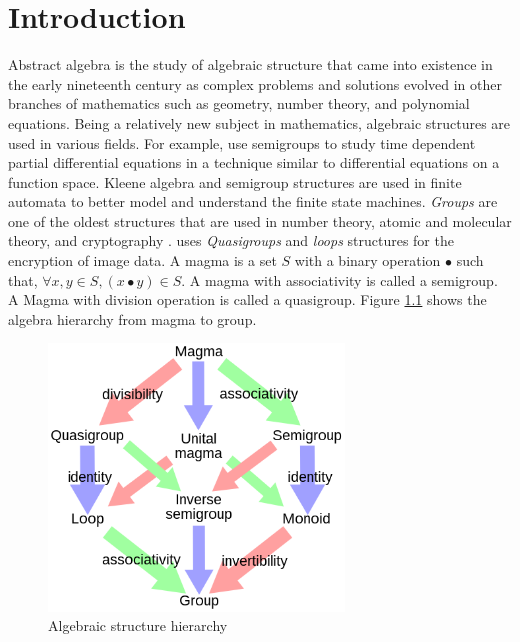 \chapter{Introduction}
Abstract algebra is the study of algebraic structure that came into existence in
the early nineteenth century as complex problems and solutions evolved in other
branches of mathematics such as geometry, number theory, and polynomial
equations. Being a relatively new subject in mathematics, algebraic structures
are used in various fields. For example, \cite{liaqat2021some} use semigroups
 to study time dependent partial
differential equations in a technique similar to differential equations on a
function space. Kleene algebra and semigroup structures are used in finite
automata to better model and understand the finite state machines.
\textit{Groups} are one of the oldest structures that are used in number theory,
atomic and molecular theory, and cryptography \cite{enwiki:1133598242}.
\cite{bruck1944some} uses \textit{Quasigroups} and \textit{loops} structures for
the encryption of image data. A magma is a set $S$ with a binary operation $∙$
such that, $\forall x,y \in S, (x ∙ y) \in S$. A magma with
associativity is called a semigroup. A Magma with division operation is called a
quasigroup. Figure \ref{fig_magma} shows the algebra hierarchy from magma to
group. 
 \begin{figure}[ht]
	\centering
	\includegraphics[width=0.7\textwidth]{figures/Sample/Magma_to_group.jpg}
	\caption{Algebraic structure hierarchy \cite{enwiki:1107380309}}
	\label{fig_magma}
 \end{figure}

